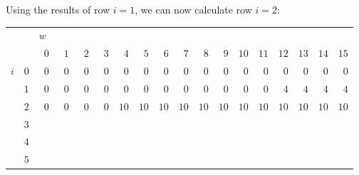 %
%

Using the results of row $i = 1$, we can now calculate row $i = 2$:
\begin{center}
    \begin{tabular}{cr|rrrrrrrrrrrrrrrr|}
        {}
            &
            & \multicolumn{16}{l|}{$w$} \\
        {}
            &
            & $\phantom{0}0$ & $\phantom{0}1$ & $\phantom{0}2$ & $\phantom{0}3$
            & $\phantom{0}4$ & $\phantom{0}5$ & $\phantom{0}6$ & $\phantom{0}7$
            & $\phantom{0}8$ & $\phantom{0}9$
            & $10$ & $11$ & $12$ &$13$ & $14$ & $15$ \\ \hline
        $i$
            & $0$
            & $0$ & $0$ & $0$ & $0$ & $0$ & $0$ & $0$ & $0$
            & $0$ & $0$ & $0$ & $0$ & $0$ & $0$ & $0$ & $0$ \\
        {}
            & $1$
            & $0$ & $0$ & $0$ & $0$ & $0$ & $0$ & $0$ & $0$
            & $0$ & $0$ & $0$ & $0$ & $4$ & $4$ & $4$ & $4$ \\
        {}
            & $2$
            & $0$ & $0$ & $0$ & $0$ & $10$ & $10$ & $10$ & $10$
            & $10$ & $10$ & $10$ & $10$ & $10$ & $10$ & $10$ & $10$ \\
        {}
            & $3$
            & & & & & & & & & & & & & & & & \\
        {}
            & $4$
            & & & & & & & & & & & & & & & & \\
        {}
            & $5$
            & & & & & & & & & & & & & & & & \\ \hline
    \end{tabular}
\end{center}
\SkipAfterTable

